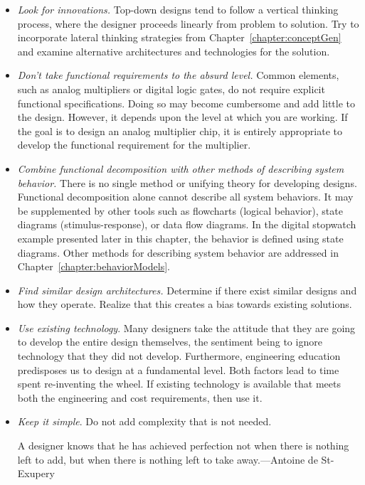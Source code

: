 \begin{itemize}
\item
  \emph{Look for innovations.} Top-down designs tend to follow a
  vertical thinking process, where the designer proceeds linearly from
  problem to solution. Try to incorporate lateral thinking strategies
  from 
  Chapter~\ref{chapter:conceptGen} 
  and examine alternative architectures and technologies for the solution.
\item
  \emph{Don't take functional requirements to the absurd level.} Common
  elements, such as analog multipliers or digital logic gates, do not
  require explicit functional specifications. Doing so may become
  cumbersome and add little to the design. However, it depends upon the
  level at which you are working. If the goal is to design an analog
  multiplier chip, it is entirely appropriate to develop the functional
  requirement for the multiplier.
\item
  \emph{Combine functional decomposition with other methods of
  describing system behavior.} There is no single method or unifying
  theory for developing designs. Functional decomposition alone cannot
  describe all system behaviors. It may be supplemented by other tools
  such as flowcharts (logical behavior), state diagrams
  (stimulus-response), or data flow diagrams. In the digital stopwatch
  example presented later in this chapter, the behavior is defined using
  state diagrams. Other methods for describing system behavior are
  addressed in Chapter~\ref{chapter:behaviorModels}.
\item
  \emph{Find similar design architectures.} Determine if there exist
  similar designs and how they operate. Realize that this creates a bias
  towards existing solutions.
\item
  \emph{Use existing technology}. Many designers take the attitude that
  they are going to develop the entire design themselves, the sentiment
  being to ignore technology that they did not develop. Furthermore,
  engineering education predisposes us to design at a fundamental level.
  Both factors lead to time spent re-inventing the wheel. If existing
  technology is available that meets both the engineering and cost
  requirements, then use it.
\item
  \emph{Keep it simple}. Do not add complexity that is not needed.


\begin{itquote}
A designer knows that he has achieved perfection not when there is
nothing left to add, but when there is nothing left to take
away.---Antoine de St-Exupery
\end{itquote}



\end{itemize}
